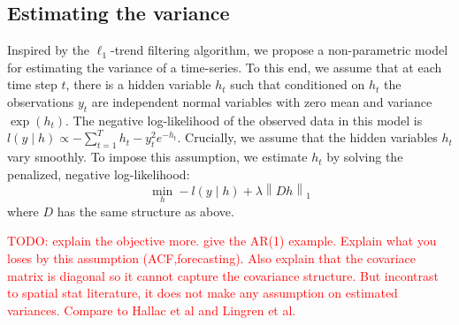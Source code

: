 \documentclass{article}
\newcommand{\attn}[1]{\textcolor{red}{TODO: #1}}
\newcommand{\given}{\;\vert\;}
\newcommand{\norm}[1]{\left\lVert #1 \right\rVert}
\begin{document}

\subsection{Estimating the variance}
\label{sec:l1tf_var}


Inspired by the $\ell_1$-trend filtering algorithm, we propose a
non-parametric model for estimating the variance of a time-series. To
this end, we assume that at each time step $t$, there is a hidden
variable $h_t$ such that conditioned on $h_t$ the observations $y_t$
are independent normal variables with zero mean and variance
$\exp(h_t)$. The negative log-likelihood of the observed data in this
model is $l(y\given h) \propto -\sum_{t=1}^Th_t - y_t^2e^{-h_t}$. Crucially,
we assume that the hidden variables $h_t$ vary smoothly. To impose
this assumption, we estimate $h_t$ by solving the penalized, negative
log-likelihood: 
\begin{equation}
\min_h -l(y\given h)+\lambda \norm{ Dh }_1
\label{eq:l1tf_var}
\end{equation}
 where $D$ has the same structure as above.

\attn{explain the objective more. give the AR(1) example. Explain what
  you loses by this assumption (ACF,forecasting). Also explain that
  the covariace matrix is diagonal so it cannot capture the covariance
  structure. But incontrast to spatial stat literature, it does not
  make any assumption on estimated variances. Compare to Hallac et al
  and Lingren et al.} 
\end{document}
